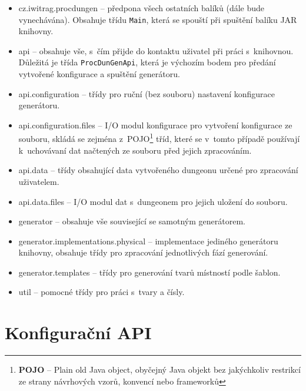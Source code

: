 \begin{itemize}
    \item cz.iwitrag.procdungen -- předpona všech ostatních balíků (dále bude vynechávána). Obsahuje třídu \texttt{Main}, která se spouští při spuštění balíku JAR knihovny.
    \item api -- obsahuje vše, s~čím přijde do kontaktu uživatel při práci s~knihovnou. Důležitá je třída \texttt{ProcDunGenApi}, která je výchozím bodem pro předání vytvořené konfigurace a spuštění generátoru.
    \item api.configuration -- třídy pro ruční (bez souboru) nastavení konfigurace generátoru.
    \item api.configuration.files -- I/O modul konfigurace pro vytvoření konfigurace ze souboru, skládá se zejména z~POJO\footnote{\textbf{POJO} -- Plain old Java object, obyčejný Java objekt bez jakýchkoliv restrikcí ze strany návrhových vzorů, konvencí nebo frameworků} tříd, které se v~tomto případě používají k~uchovávaní dat načtených ze souboru před jejich zpracováním.
    \item api.data -- třídy obsahující data vytvořeného dungeonu určené pro zpracování uživatelem.
    \item api.data.files -- I/O modul dat s~dungeonem pro jejich uložení do souboru.
    \item generator -- obsahuje vše související se samotným generátorem.
    \item generator.implementations.physical -- implementace jediného generátoru knihovny, obsahuje třídy pro zpracování jednotlivých fází generování.
    \item generator.templates -- třídy pro generování tvarů místností podle šablon.
    \item util -- pomocné třídy pro práci s~tvary a čísly.
\end{itemize}


\section{Konfigurační API}


